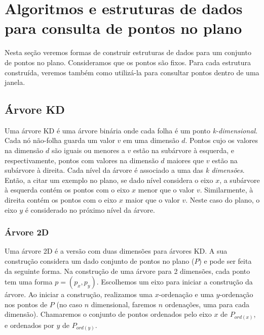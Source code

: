 \chapter{Algoritmos e estruturas de dados para consulta de pontos no plano}\label{cap:desenvolvimento}
Nesta seção veremos formas de construir estruturas de dados para um conjunto de pontos no plano. Consideramos que os pontos são fixos. Para cada estrutura construída, veremos também como utilizá-la para consultar pontos dentro de uma janela.

\section{Árvore KD}

Uma árvore KD é uma árvore binária onde cada folha é um ponto \textit{k-dimensional}.
Cada nó não-folha guarda um valor $v$ em uma dimensão $d$. Pontos cujo os valores na dimensão $d$ são iguais ou menores a $v$ estão na subárvore à esquerda, e respectivamente, pontos com valores na dimensão $d$ maiores que $v$ estão na subárvore à direita. Cada nível da árvore é associado a uma das \textit{k dimensões}. Então, a citar um exemplo no plano,
se dado nível considera o eixo $x$, a subárvore à esquerda contém os pontos com o eixo $x$ menor que o valor $v$. Similarmente, à direita contém os pontos com o eixo $x$ maior que o valor $v$. Neste caso do plano, o eixo $y$ é considerado no próximo nível da árvore.

\subsection{Árvore 2D}
Uma árvore 2D é a versão com duas dimensões para árvores KD. A sua construção considera um dado conjunto de pontos no plano ($P$) e pode ser feita da seguinte forma. Na construção de uma árvore para 2 dimensões, cada ponto tem uma forma $p = (p_x, p_y)$. Escolhemos um eixo para iniciar a construção da árvore. Ao iniciar a construção, realizamos uma $x$-ordenação e uma $y$-ordenação nos pontos de $P$ (no caso $n$ dimensional, faremos $n$ ordenações, uma para cada dimensão). Chamaremos o conjunto de pontos ordenados pelo eixo $x$ de $P_{ord(x)}$, e ordenados por $y$ de $P_{ord(y)}$.

